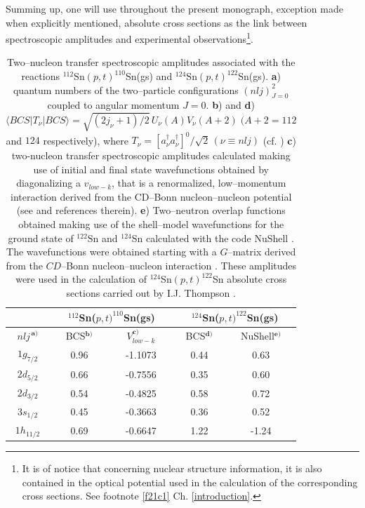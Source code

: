 Summing up, one will use throughout the present monograph, exception made when explicitly mentioned, absolute cross sections as the  link between spectroscopic amplitudes and experimental observations\footnote{It is of notice that concerning nuclear structure information, it is also contained in the optical potential used in the calculation of the corresponding cross sections. See footnote \ref{f21c1} Ch. \ref{introduction}.}.
 \begin{table}[h!]
	{\begin{tabular}{|c|c|c|c|c|}
			\cline{2-5} 
			\multicolumn{1}{c|}{ }& \multicolumn{2}{|c|}{ $^{112}$Sn($p,t)^{110}$Sn(gs)}&\multicolumn{2}{|c|}{$^{124}$Sn($p,t)^{122}$Sn(gs)} \\
			\hline
			$nlj^{\,\mathbf a)}$ & BCS$^{\mathbf b)}$ & $V_{low-k}^{\mathbf c)}$ & BCS$^{\mathbf d)}$& NuShell$^{\mathbf e)}$  \\
			\hline
			$1g_{7/2}$ & 0.96 &-1.1073 & 0.44 & 0.63  \\
			$2d_{5/2}$ & 0.66 & -0.7556& 0.35 & 0.60  \\
			$2d_{3/2}$ & 0.54 &  -0.4825& 0.58 & 0.72  \\
			$3s_{1/2}$ & 0.45 &  -0.3663&  0.36 & 0.52  \\
			$1h_{11/2}$ & 0.69 & -0.6647 & 1.22 & -1.24  \\
			\hline 
	\end{tabular}}
	\caption{Two--nucleon transfer spectroscopic amplitudes associated with the reactions $^{112}$Sn$(p,t)^{110}$Sn(gs) and $^{124}$Sn$(p,t)^{122}$Sn(gs). \textbf{a}) quantum numbers of the two--particle configurations $(nlj)^2_{J=0}$ coupled to angular momentum $J=0$. \textbf{b}) and \textbf{d}) $\langle BCS|T_\nu|BCS\rangle=\sqrt{(2j_\nu+1)/2}\,U_\nu(A) V_\nu(A+2)\;(A+2=112$ and $ 124$ respectively), where $T_\nu=[a^\dagger_{\nu}a^\dagger_\nu]^0/\sqrt{2} \,(\nu\equiv nlj)$ (cf. \cite{Potel:11,Potel:13,Potel:13b}) \textbf{c}) two-nucleon transfer spectroscopic amplitudes calculated making use of initial and final state wavefunctions obtained by diagonalizing a $v_{low-k}$, that is a renormalized, low--momentum interaction derived from the CD--Bonn nucleon--nucleon potential (see \cite{Guazzoni:06} and references therein). \textbf{e}) Two--neutron overlap functions obtained making use of the shell--model wavefunctions for the ground state of $^{122}$Sn and $^{124}$Sn calculated with the code NuShell \citep{Brown:07}. The wavefunctions were obtained starting with a $G$--matrix derived from the $CD$--Bonn nucleon--nucleon interaction \cite{Machleidt:96}. These amplitudes were used in the calculation of $^{124}$Sn$(p,t)^{122}$Sn absolute cross sections carried out by I.J. Thompson \citep{Thompson:13}.}\label{tab1D1}
\end{table}
